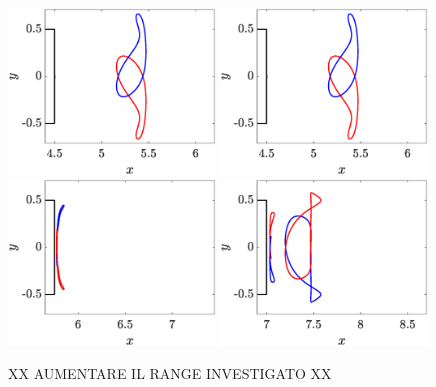 \documentclass{jfm}
\begin{document}
\begin{figure}
  \centering
  \includegraphics[width=0.49\textwidth]{./fig/LagTrac/orb_AR4p5_Re410.eps}   
  \includegraphics[width=0.49\textwidth]{./fig/LagTrac/orb_AR4p5_Re410.eps} 
  \includegraphics[width=0.49\textwidth]{./fig/LagTrac/orb_AR5p75_Re550.eps}
  \includegraphics[width=0.49\textwidth]{./fig/LagTrac/orb_AR7_Re500.eps}
  \caption{XX AUMENTARE IL RANGE INVESTIGATO XX}
  \label{fig:part_res}
\end{figure}    
\end{document}
